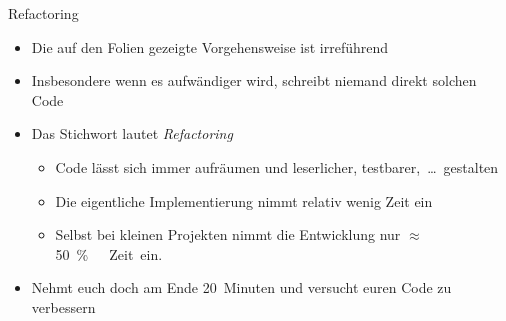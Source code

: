 {\AddonFrame
\begin{frame}{Refactoring}
 \begin{itemize}[<+(1)->]
    \itemsep9pt
     \item Die auf den Folien gezeigte Vorgehensweise ist irreführend
     \item Insbesondere wenn es aufwändiger wird, schreibt niemand direkt solchen Code
     \item Das Stichwort lautet \textit{Refactoring}
        \begin{itemize}
            \itemsep4pt
            \item Code lässt sich immer aufräumen und leserlicher, testbarer,~\ldots\ gestalten
            \item Die eigentliche Implementierung nimmt relativ wenig Zeit ein 
            \item Selbst bei kleinen Projekten  nimmt die Entwicklung nur $\approx$\qty{50}\percent\ Zeit ein.
        \end{itemize}
     \item Nehmt euch doch am Ende 20~Minuten und versucht euren Code zu verbessern
 \end{itemize}
\end{frame}
}

